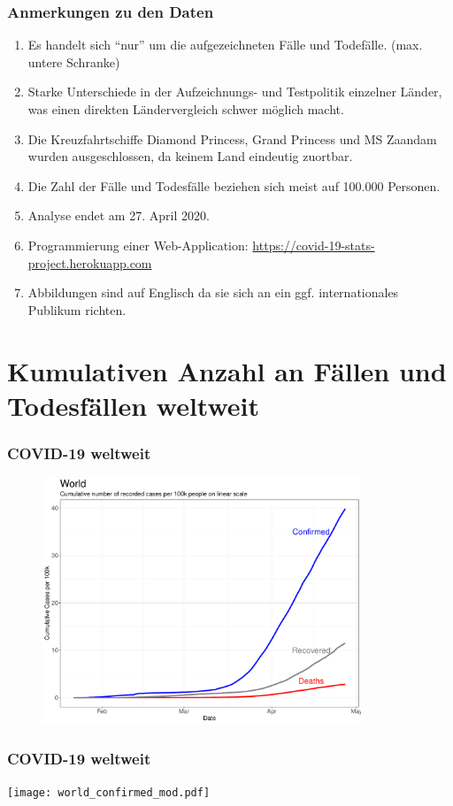 \documentclass{beamer}
\begin{document}
 \begin{frame}
 	\frametitle{Anmerkungen zu den Daten}
 	\begin{enumerate}
 		\item Es handelt sich ``nur'' um die aufgezeichneten Fälle und Todefälle. (max. untere Schranke)
 		\item Starke Unterschiede in der Aufzeichnungs- und Testpolitik einzelner Länder, was einen direkten Ländervergleich schwer möglich macht. 
 		\item Die Kreuzfahrtschiffe Diamond Princess, Grand Princess und MS Zaandam wurden ausgeschlossen, da keinem Land eindeutig zuortbar. 
 		\item Die Zahl der Fälle und Todesfälle beziehen sich meist auf 100.000 Personen.
 		\item Analyse endet am 27. April 2020.
 		\pause
 		\item Programmierung einer Web-Application: \url{https://covid-19-stats-project.herokuapp.com}
 		\item Abbildungen sind auf Englisch da sie sich an ein ggf. internationales Publikum richten.
 	\end{enumerate}
 \end{frame}
 
 \section{Kumulativen Anzahl an Fällen und Todesfällen weltweit}
 \begin{frame}
 	\frametitle{COVID-19 weltweit}
	\begin{figure}
		\centering
		\includegraphics[width = 270pt]{Cases_world.pdf}
	\end{figure}
 \end{frame}

 \begin{frame}
 	\frametitle{COVID-19 weltweit}
		\centering
		\texttt{[image: world\_confirmed\_mod.pdf]}
 \end{frame}
\end{document}
